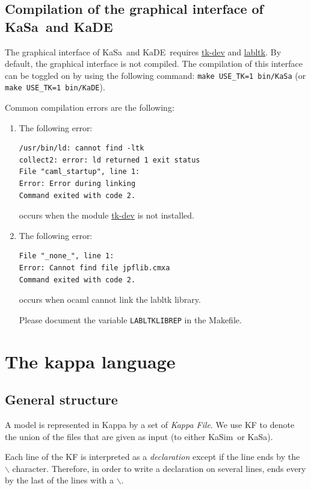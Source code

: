\documentclass[11pt]{book}
\def\KaSim{\textsf{KaSim}}
\def\KaSa{\textsf{KaSa}}
\def\KaDE{\textsf{KaDE}}
\def\ttt#1{\texttt{#1}}
\def\bs{\backslash}
\begin{document}
\section{Compilation of the graphical interface of KaSa~and KaDE}

The graphical interface of \KaSa~and \KaDE~requires
\href{http://www.tcl.tk/}{tk-dev} and
\href{https://forge.ocamlcore.org/projects/labltk/}{labltk}. By
default, the graphical interface is not compiled. The compilation of
this interface can be toggled on by using the following command:
\ttt{make USE\_TK=1 bin/KaSa} (or \ttt{make USE\_TK=1 bin/KaDE}).

Common compilation errors are the following:
\begin{enumerate}
\item The following error:

\begin{verbatim}
/usr/bin/ld: cannot find -ltk
collect2: error: ld returned 1 exit status
File "caml_startup", line 1:
Error: Error during linking
Command exited with code 2.
\end{verbatim}

occurs when the module  \href{http://www.tcl.tk/}{tk-dev} is not installed.
\item The following error:

\begin{verbatim}
File "_none_", line 1:
Error: Cannot find file jpflib.cmxa
Command exited with code 2.
\end{verbatim}

occurs when ocaml cannot link the labltk library.

Please document the variable \texttt{LABLTKLIBREP} in the Makefile.

\end{enumerate}

\chapter{The kappa language}\label{chap:kappa}

\section{General structure}
A model is represented in Kappa by a set of \emph{Kappa File}. We use
KF to denote the union of the files that are given
as input (to either \KaSim~or \KaSa).

Each line of the KF is interpreted as a
\emph{declaration} except if the line ends by
the~{\textquotesingle} \ttt{$\bs$}{\textquotesingle}
character. Therefore, in order to write a
declaration on several lines, ends every by the
last of the lines with a \ttt{$\bs$}.
\end{document}
